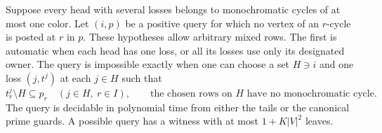 \begin{theorem}
\label{core:thm:monochromatic-head-cut}
Suppose every head with several losses belongs to monochromatic cycles
of at most one color. Let $(i,p)$ be a positive query for which no
vertex of an $r$-cycle is posted at $r$ in $p$. These hypotheses
allow arbitrary mixed rows. The first is automatic when each head
has one loss, or all its losses use only its designated owner.
The query is impossible exactly when one
can choose a set $H\ni i$ and one loss $(j,t^j)$ at each $j\in H$
such that
\[
 t^j_r\setminus H\subseteq p_r\quad(j\in H,\ r\in I),\qquad
 \text{the chosen rows on $H$ have no monochromatic cycle}.
\]
The query is decidable in polynomial time from either the tails or
the canonical prime guards. A possible query has a witness with at
most $1+K|V|^2$ leaves.
\end{theorem}
